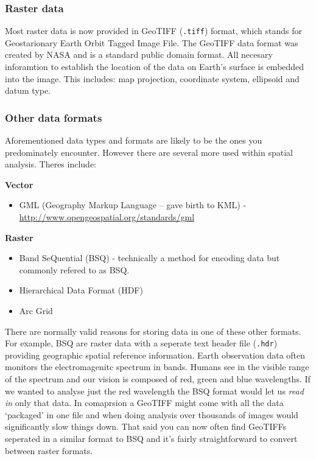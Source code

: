 \documentclass[]{book}
\providecommand{\tightlist}{%
  \setlength{\itemsep}{0pt}\setlength{\parskip}{0pt}}
\begin{document}
\hypertarget{raster-data}{%
\subsubsection{Raster data}\label{raster-data}}

Most raster data is now provided in GeoTIFF (\texttt{.tiff}) format, which stands for Geostarionary Earth Orbit Tagged Image File. The GeoTIFF data format was created by NASA and is a standard public domain format. All necesary inforamtion to establish the location of the data on Earth's surface is embedded into the image. This includes: map projection, coordinate system, ellipsoid and datum type.

\hypertarget{other-data-formats}{%
\subsubsection{Other data formats}\label{other-data-formats}}

Aforementioned data types and formats are likely to be the ones you predominately encounter. However there are several more used within spatial analysis. Theres include:

\textbf{Vector}

\begin{itemize}
\tightlist
\item
  GML (Geography Markup Language -- gave birth to KML) - \url{http://www.opengeospatial.org/standards/gml}
\end{itemize}

\textbf{Raster}

\begin{itemize}
\tightlist
\item
  Band SeQuential (BSQ) - technically a method for encoding data but commonly refered to as BSQ.
\item
  Hierarchical Data Format (HDF)
\item
  Arc Grid
\end{itemize}

There are normally valid reasons for storing data in one of these other formats. For example, BSQ are raster data with a seperate text header file (\texttt{.hdr}) providing geographic spatial reference information. Earth observation data often monitors the electromagenitc spectrum in bands. Humans see in the visible range of the spectrum and our vision is composed of red, green and blue wavelengths. If we wanted to analyse just the red wavelength the BSQ format would let us \emph{read in} only that data. In comaprsion a GeoTIFF might come with all the data `packaged' in one file and when doing analysis over thousands of images would significantly slow things down. That said you can now often find GeoTIFFs seperated in a similar format to BSQ and it's fairly straightforward to convert between raster formats.
\end{document}
